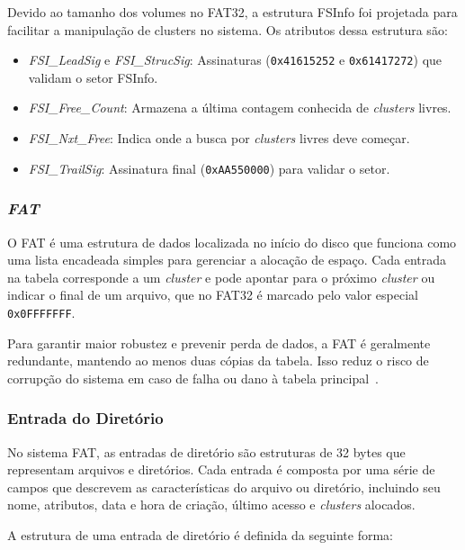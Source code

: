 \documentclass[
    12pt,				%
    oneside,   	        %
    a4paper,			%
    english,			%
    french,				%
    spanish,			%
    brazil,				%
    ]{pacotes/abntex2}
\begin{document}
Devido ao tamanho dos volumes no FAT32, a estrutura FSInfo foi projetada para facilitar a manipulação de clusters no sistema. Os atributos dessa estrutura são:

\begin{itemize}
    \item \textit{FSI\_LeadSig} e \textit{FSI\_StrucSig}: Assinaturas (\texttt{0x41615252} e \texttt{0x61417272}) que validam o setor FSInfo.
    \item \textit{FSI\_Free\_Count}: Armazena a última contagem conhecida de \textit{clusters} livres.
    \item \textit{FSI\_Nxt\_Free}: Indica onde a busca por \textit{clusters} livres deve começar.
    \item \textit{FSI\_TrailSig}: Assinatura final (\texttt{0xAA550000}) para validar o setor.
\end{itemize}

\subsubsection{\textit{FAT}}
\label{subsubsec:fsinfo}

O FAT é uma estrutura de dados localizada no início do disco que funciona como uma lista encadeada simples para gerenciar a alocação de espaço. Cada entrada na tabela corresponde a um \textit{cluster} e pode apontar para o próximo \textit{cluster} ou indicar o final de um arquivo, que no FAT32 é marcado pelo valor especial \texttt{0x0FFFFFFF}.

Para garantir maior robustez e prevenir perda de dados, a FAT é geralmente redundante, mantendo ao menos duas cópias da tabela. Isso reduz o risco de corrupção do sistema em caso de falha ou dano à tabela principal~\cite{microsoft2000}.

\subsubsection{Entrada do Diretório}
\label{subsubsec:dentry}

No sistema FAT, as entradas de diretório são estruturas de 32 bytes que representam arquivos e diretórios. Cada entrada é composta por uma série de campos que descrevem as características do arquivo ou diretório, incluindo seu nome, atributos, data e hora de criação, último acesso e \textit{clusters} alocados.

A estrutura de uma entrada de diretório é definida da seguinte forma:
\end{document}
